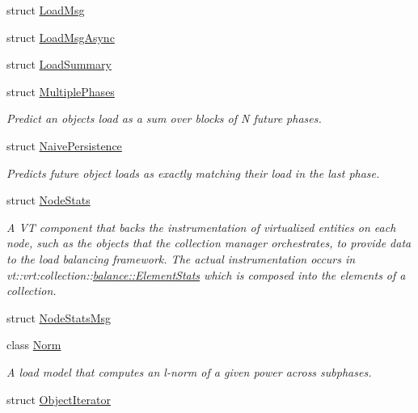 \begin{DoxyCompactItemize}
struct \hyperlink{structvt_1_1vrt_1_1collection_1_1balance_1_1_load_msg}{Load\+Msg}
\item 
struct \hyperlink{structvt_1_1vrt_1_1collection_1_1balance_1_1_load_msg_async}{Load\+Msg\+Async}
\item 
struct \hyperlink{structvt_1_1vrt_1_1collection_1_1balance_1_1_load_summary}{Load\+Summary}
\item 
struct \hyperlink{structvt_1_1vrt_1_1collection_1_1balance_1_1_multiple_phases}{Multiple\+Phases}
\begin{DoxyCompactList}\small\item\em Predict an object\textquotesingle{}s load as a sum over blocks of N future phases. \end{DoxyCompactList}\item 
struct \hyperlink{structvt_1_1vrt_1_1collection_1_1balance_1_1_naive_persistence}{Naive\+Persistence}
\begin{DoxyCompactList}\small\item\em Predicts future object loads as exactly matching their load in the last phase. \end{DoxyCompactList}\item 
struct \hyperlink{structvt_1_1vrt_1_1collection_1_1balance_1_1_node_stats}{Node\+Stats}
\begin{DoxyCompactList}\small\item\em A VT component that backs the instrumentation of virtualized entities on each node, such as the objects that the collection manager orchestrates, to provide data to the load balancing framework. The actual instrumentation occurs in {\ttfamily vt\+::vrt\+:collection\+:}\+:\hyperlink{structvt_1_1vrt_1_1collection_1_1balance_1_1_element_stats}{balance\+::\+Element\+Stats} which is composed into the elements of a collection. \end{DoxyCompactList}\item 
struct \hyperlink{structvt_1_1vrt_1_1collection_1_1balance_1_1_node_stats_msg}{Node\+Stats\+Msg}
\item 
class \hyperlink{classvt_1_1vrt_1_1collection_1_1balance_1_1_norm}{Norm}
\begin{DoxyCompactList}\small\item\em A load model that computes an l-\/norm of a given power across subphases. \end{DoxyCompactList}\item 
struct \hyperlink{structvt_1_1vrt_1_1collection_1_1balance_1_1_object_iterator}{Object\+Iterator}
\item 

\end{DoxyCompactItemize}
